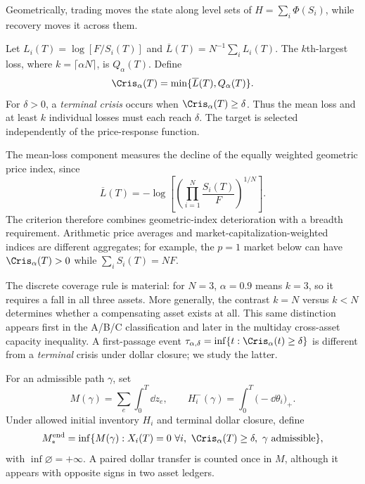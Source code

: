\documentclass[review,hidelinks,onefignum,onetabnum]{siamonline250211}
\begin{document}
Geometrically, trading moves the state along level sets of
$H=\sum_i\Phi(S_i)$, while recovery moves it across them.

\begin{definition}\label{def:crash}
Let $L_i(T)=\log[F/S_i(T)]$ and $\overline L(T)=N^{-1}\sum_i L_i(T)$. The $k$th-largest loss, where $k=\lceil\alpha N\rceil$, is $Q_\alpha(T)$. Define
\begin{equation}\label{eq:crash}
\Cris_\alpha(T)=\min\{\overline L(T),Q_\alpha(T)\}.
\end{equation}
For $\delta>0$, a \emph{terminal crisis} occurs when $\Cris_\alpha(T)\ge\delta$. Thus the mean loss and at least $k$ individual losses must each reach $\delta$. The target is selected independently of the price-response function.
\end{definition}

The mean-loss component measures the decline of the equally weighted geometric price index, since
\[
\overline L(T)=-\log\!\left[\left(\prod_{i=1}^{N}\frac{S_i(T)}{F}\right)^{1/N}\right].
\]
The criterion therefore combines geometric-index deterioration with a breadth requirement. Arithmetic price averages and market-capitalization-weighted indices are different aggregates; for example, the $p=1$ market below can have $\Cris_\alpha(T)>0$ while $\sum_i S_i(T)=NF$.

The discrete coverage rule is material: for $N=3$, $\alpha=0.9$ means $k=3$, so it requires a fall in all three assets. More generally, the contrast $k=N$ versus $k<N$ determines whether a compensating asset exists at all. This same distinction appears first in the A/B/C classification and later in the multiday cross-asset capacity inequality. A first-passage event $\tau_{\alpha,\delta}=\inf\{t:\Cris_\alpha(t)\ge\delta\}$ is different from a \emph{terminal} crisis under dollar closure; we study the latter.

\begin{definition}\label{def:budget}
For an admissible path $\gamma$, set
\begin{equation}\label{eq:resource}
M(\gamma)=\sum_e\int_0^T\dd z_e,\qquad
H_i^-(\gamma)=\int_0^T\big(-\dd\theta_i\big)_+.
\end{equation}
Under allowed initial inventory $H_i$ and terminal dollar closure, define
\begin{equation}\label{eq:minbudget}
M_*^{\rm end}=\inf\{M(\gamma): X_i(T)=0\ \forall i,\ \Cris_\alpha(T)\ge\delta,\ \gamma\text{ admissible}\},
\end{equation}
with $\inf\varnothing=+\infty$. A paired dollar transfer is counted once in $M$, although it appears with opposite signs in two asset ledgers.
\end{definition}
\end{document}
